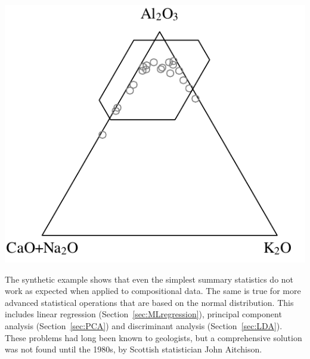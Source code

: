 \noindent\begin{minipage}[t][][b]{.4\textwidth}
\includegraphics[width=\textwidth]{../figures/ACNKnaive.pdf}\medskip
\end{minipage}
\begin{minipage}[t][][t]{.6\textwidth}
  \label{fig:ACNKnaive}
\end{minipage}

The synthetic example shows that even the simplest summary statistics
do not work as expected when applied to compositional data.  The same
is true for more advanced statistical operations that are based on the
normal distribution. This includes linear regression
(Section~\ref{sec:MLregression}), principal component analysis
(Section~\ref{sec:PCA}) and discriminant analysis
(Section~\ref{sec:LDA}). These problems had long been known to
geologists, but a comprehensive solution was not found until the
1980s, by Scottish statistician John Aitchison.\medskip

